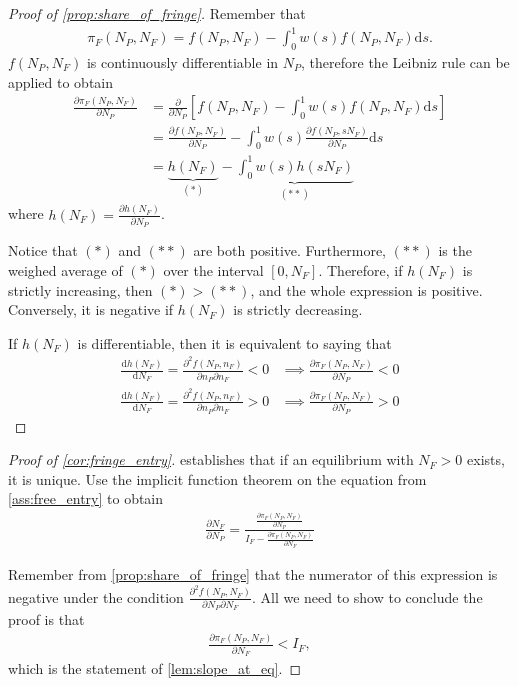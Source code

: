 \documentclass[a4paper]{article}
\newcommand{\ds}{\mathrm{d}s}
\begin{document}
\begin{proof}[Proof of \cref{prop:share_of_fringe}]
    Remember that
    \begin{align*}
        \pi_F(N_P, N_F) = f(N_P, N_F) - \int_0^1 w(s) f(N_P, N_F) \ds.
    \end{align*}
    $f(N_P, N_F)$ is continuously differentiable in $N_P$, therefore the Leibniz rule can be applied to obtain
    \begin{align*}
        \frac{\partial \pi_F(N_P, N_F)}{\partial N_P} &= \frac{\partial}{\partial N_P} \left[ f(N_P, N_F) - \int_0^1 w(s) f(N_P, N_F) \ds \right]\\
        &= \frac{\partial f(N_P, N_F)}{\partial N_P} - \int_0^1 w(s) \frac{\partial f(N_P, sN_F)}{\partial N_P} \ds \\
        &= \underbrace{h(N_F)}_{(*)} - \underbrace{\int_0^1 w(s) h(s N_F)}_{(**)}
    \end{align*}
    where $h(N_F) = \frac{\partial h(N_F)}{\partial N_P}$.

    Notice that $(*)$ and $(**)$ are both positive.
    Furthermore, $(**)$ is the weighed average of $(*)$ over the interval $[0, N_F]$.
    Therefore, if $h(N_F)$ is strictly increasing, then $(*) > (**)$, and the whole expression is positive.
    Conversely, it is negative if $h(N_F)$ is strictly decreasing.

    If $h(N_F)$ is differentiable, then it is equivalent to saying that
    \begin{align*}
        \frac{\mathrm{d}h(N_F)}{\mathrm{d}N_F} = \frac{\partial^2 f(N_P, n_F)}{\partial n_P \partial n_F} < 0 &\implies \frac{\partial \pi_F(N_P, N_F)}{\partial N_P} < 0 \\
        \frac{\mathrm{d}h(N_F)}{\mathrm{d}N_F} = \frac{\partial^2 f(N_P, n_F)}{\partial n_P \partial n_F} > 0 &\implies \frac{\partial \pi_F(N_P, N_F)}{\partial N_P} > 0
    \end{align*}
\end{proof}

\begin{proof}[Proof of \cref{cor:fringe_entry}]
     establishes that if an equilibrium with $N_F > 0$ exists, it is unique.
    Use the implicit function theorem on the equation from \cref{ass:free_entry} to obtain
    \begin{align*}
        \frac{\partial N_F}{\partial N_P} = \frac{\frac{\partial \pi_F(N_P, N_F)}{\partial N_P}}{I_F - \frac{\partial \pi_F (N_P, N_F)}{\partial N_F}}
    \end{align*}

    Remember from \cref{prop:share_of_fringe} that the numerator of this expression is negative under the condition $\frac{\partial^2 f(N_P, N_F)}{\partial N_P \partial N_F}$.
    All we need to show to conclude the proof is that
    \begin{align*}
        \frac{\partial \pi_F (N_P, N_F)}{\partial N_F} < I_F,
    \end{align*}
    which is the statement of \cref{lem:slope_at_eq}.
\end{proof}
\end{document}

